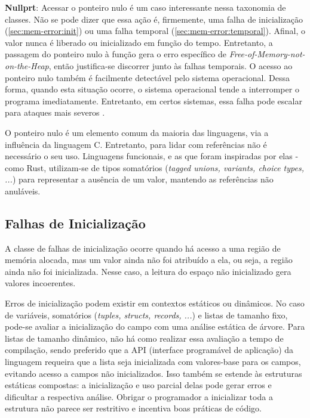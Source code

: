 \textbf{Nullprt}: Acessar o ponteiro nulo é um caso interessante nessa taxonomia de classes. Não se pode dizer que essa ação é, firmemente, uma falha de inicialização (\autoref{sec:mem-error:init}) ou uma falha temporal (\autoref{sec:mem-error:temporal}). Afinal, o valor nunca é liberado ou inicializado em função do tempo. Entretanto, a passagem do ponteiro nulo à função \FREE gera o erro específico de \emph{Free-of-Memory-not-on-the-Heap}, então justifica-se discorrer junto às falhas temporais. O acesso ao ponteiro nulo também é facilmente detectável pelo sistema operacional. Dessa forma, quando esta situação ocorre, o sistema operacional tende a interromper o programa imediatamente. Entretanto, em certos sistemas, essa falha pode escalar para ataques mais severos \cite[p.4]{MemErrorPastPresentFuture}.

O ponteiro nulo é um elemento comum da maioria das linguagens, via a influência da linguagem C. Entretanto, para lidar com referências não é necessário o seu uso. Linguagens funcionais, e as que foram inspiradas por elas - como Rust, utilizam-se de tipos somatórios (\emph{tagged unions, variants, choice types, ...}) para representar a ausência de um valor, mantendo as referências não anuláveis.


\subsection{Falhas de Inicialização}
\label{sec:mem-error:init}

A classe de falhas de inicialização ocorre quando há acesso a uma região de memória alocada, mas um valor ainda não foi atribuído a ela, ou seja, a região ainda não foi inicializada. Nesse caso, a leitura do espaço não inicializado gera valores incoerentes. %

Erros de inicialização podem existir em contextos estáticos ou dinâmicos. No caso de variáveis, somatórios (\emph{tuples, structs, records, ...}) e listas de tamanho fixo, pode-se avaliar a inicialização do campo com uma análise estática de árvore. Para listas de tamanho dinâmico, não há como realizar essa avaliação a tempo de compilação, sendo preferido que a API (interface programável de aplicação) da linguagem requeira que a lista seja inicializada com valores-base para os campos, evitando acesso a campos não inicializados. Isso também se estende às estruturas estáticas compostas: a inicialização e uso parcial delas pode gerar erros e dificultar a respectiva análise. Obrigar o programador a inicializar toda a estrutura não parece ser restritivo e incentiva boas práticas de código.

